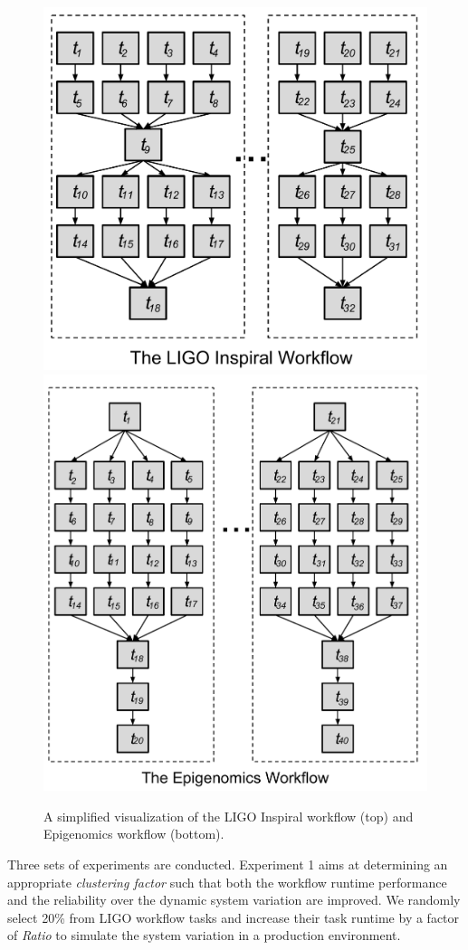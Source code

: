 \documentclass[final]{IEEEtran}
\begin{document}
\begin{figure}[htb]
	\centering
	\includegraphics[width=0.6\linewidth]{figure/shape_of_inspiral.pdf} \\
	\includegraphics[width=0.7\linewidth]{figure/shape_of_genome.pdf}
	\caption{A simplified visualization of the LIGO Inspiral workflow (top) and Epigenomics workflow (bottom).}
	\label{fig:shape}
	\vspace{-10pt}
\end{figure}

Three sets of experiments are conducted. Experiment 1 aims at determining an appropriate \emph{clustering factor} such that both the workflow runtime performance and the reliability over the dynamic system variation are improved. We randomly select 20\% from LIGO workflow tasks and increase their task runtime by a factor of \emph{Ratio} to simulate the system variation in a production environment.
\end{document}

